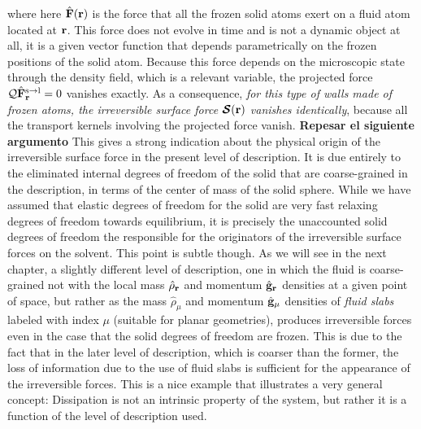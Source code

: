 \documentclass[b5paper,openright,11pt]{book}
\newcommand{\Note}[1]{{\bf \color{red}#1}}    %
\begin{document}
where here  $\hat{\bf F}({\bf r})$  is the  force that all  the frozen
solid atoms  exert on a fluid  atom located at ${\bf  r}$.  This force
does not evolve  in time and is not  a dynamic object at all,  it is a
given  vector  function  that  depends parametrically  on  the  frozen
positions  of the  solid  atom.   Because this  force  depends on  the
microscopic  state through  the  density field,  which  is a  relevant
variable, the projected force ${\cal Q}\hat{\bf F}_{{\bf r}}^{\rm s\to
  l}=0$ vanishes exactly.  As a  consequence, \textit{for this type of
  walls  made   of  frozen  atoms,  the   irreversible  surface  force
  $\boldsymbol{{\cal S}}({\bf r})$  vanishes identically}, because all
  the  transport kernels  involving  the projected  force vanish.  \Note{Repesar el siguiente argumento} This
gives  a   strong  indication  about   the  physical  origin   of  the
irreversible surface force in the  present level of description. It is
due  entirely to  the eliminated  internal degrees  of freedom  of the
solid  that are  coarse-grained in  the description,  in terms  of the
center of mass of the solid sphere. While we have assumed that elastic
degrees of  freedom for the  solid are  very fast relaxing  degrees of
freedom  towards equilibrium,  it is  precisely the  unaccounted solid
degrees  of  freedom  the  responsible  for  the  originators  of  the
irreversible  surface forces  on the  solvent.  This  point is  subtle
though.   As we  will  see  in the next chapter, a  slightly
different  level   of  description,   one  in   which  the   fluid  is
coarse-grained  not  with  the  local mass  $\hat{\rho}_{\bf  r}$  and
momentum $\hat{\bf  g}_{\bf r}$ densities  at a given point  of space,
but rather as the mass $\hat{\rho}_\mu$ and momentum $\hat{\bf g}_\mu$
densities of  \textit{fluid slabs} labeled with  index $\mu$ (suitable
for planar geometries), produces irreversible  forces even in the case
that the solid degrees of freedom are  frozen. This is due to the fact
that in  the later  level of  description, which  is coarser  than the
former,  the loss  of information  due to  the use  of fluid  slabs is
sufficient for the  appearance of the irreversible forces.   This is a
nice example that  illustrates a very general  concept: Dissipation is
not an intrinsic  property of the system, but rather  it is a function
of the level of description used.
\end{document}
